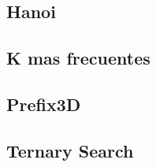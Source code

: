 \subsection{Hanoi}
\raggedbottom
\hrulefill
\subsection{K mas frecuentes}
\raggedbottom
\hrulefill
\subsection{Prefix3D}
\raggedbottom
\hrulefill
\subsection{Ternary Search}
\raggedbottom
\hrulefill

